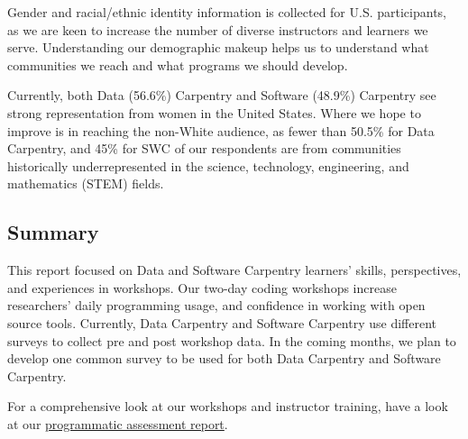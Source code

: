 \documentclass[]{article}
\begin{document}
Gender and racial/ethnic identity information is collected for U.S.
participants, as we are keen to increase the number of diverse
instructors and learners we serve. Understanding our demographic makeup
helps us to understand what communities we reach and what programs we
should develop.

Currently, both Data (56.6\%) Carpentry and Software (48.9\%) Carpentry
see strong representation from women in the United States. Where we hope
to improve is in reaching the non-White audience, as fewer than 50.5\%
for Data Carpentry, and 45\% for SWC of our respondents are from
communities historically underrepresented in the science, technology,
engineering, and mathematics (STEM) fields.

\subsection{Summary}\label{summary}

This report focused on Data and Software Carpentry learners' skills,
perspectives, and experiences in workshops. Our two-day coding workshops
increase researchers' daily programming usage, and confidence in working
with open source tools. Currently, Data Carpentry and Software Carpentry
use different surveys to collect pre and post workshop data. In the
coming months, we plan to develop one common survey to be used for both
Data Carpentry and Software Carpentry.

For a comprehensive look at our workshops and instructor training, have
a look at our
\href{https://carpentries.github.io/assessment/programmatic-assessment/workshops/outputs/final_report.html}{programmatic
assessment report}.
\end{document}
